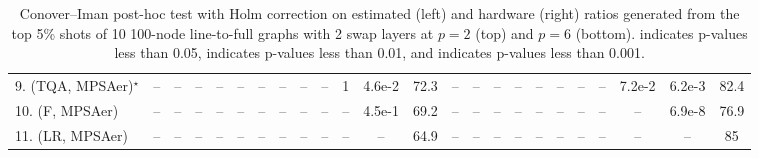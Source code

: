 \begin{table}[ht]
{\begin{tabular}{l|cccccccccccc|ccccccccccc|}
9. (TQA, MPSAer)$^\star$ & -- & -- & -- & -- & -- & -- & -- & -- & -- & 1 & {\cellcolor[HTML]{B5E1AE}} \color[HTML]{000000} 4.6e-2 & 72.3 & -- & -- & -- & -- & -- & -- & -- & -- & 7.2e-2 & {\cellcolor[HTML]{309950}} \color[HTML]{F1F1F1} 6.2e-3 & 82.4 \\
10. (F, MPSAer) & -- & -- & -- & -- & -- & -- & -- & -- & -- & -- & 4.5e-1 & 69.2 & -- & -- & -- & -- & -- & -- & -- & -- & -- & {\cellcolor[HTML]{00441B}} \color[HTML]{F1F1F1} 6.9e-8 & 76.9 \\
11. (LR, MPSAer) & -- & -- & -- & -- & -- & -- & -- & -- & -- & -- & -- & 64.9 & -- & -- & -- & -- & -- & -- & -- & -- & -- & -- & 85 \\
\hline

\end{tabular}
}
\caption{Conover–Iman post-hoc test with Holm correction on estimated (left) and hardware (right) ratios generated from the top 5\% shots of 10 100-node line-to-full graphs with 2 swap layers at $p=2$ (top) and $p=6$ (bottom).  indicates p-values less than 0.05,  indicates p-values less than 0.01, and  indicates p-values less than 0.001.}
\label{tab:N100L2S2_2_6_5pc_hw}
\end{table}